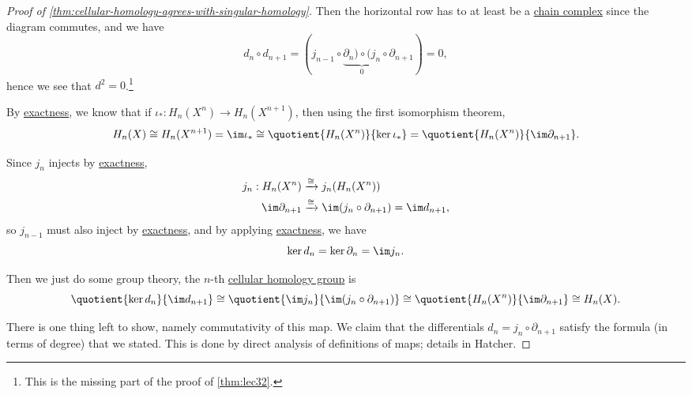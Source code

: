\begin{proof}[Proof of \autoref{thm:cellular-homology-agrees-with-singular-homology}]
	Then the horizontal row has to at least be a \hyperref[def:chain-complex]{chain complex} since the diagram commutes, and we have
	\[
		d_{n} \circ d_{n+1}  = (j_{n - 1} \circ \underbrace{\partial_n) \circ (j_n}_{0} \circ \partial_{n + 1}) = 0,
	\]
	hence we see that \(d^{2} = 0\).\footnote{This is the missing part of the proof of \autoref{thm:lec32}.}

	By \hyperref[def:exact]{exactness}, we know that if \(\iota_\ast \colon H_n(X^n) \to H_n(X^{n + 1})\), then using the first isomorphism theorem,
	\[
		H_n(X) \cong H_n(X^{n + 1}) = \im \iota_\ast \cong  \quotient{H_n(X^n)}{\ker \iota_\ast} = \quotient{H_n(X^n)}{\im \partial_{n + 1}}.
	\]

	Since \(j_n\) injects by \hyperref[def:exact]{exactness},
	\begin{align*}
		j_n : H_n(X^n)       & \xrightarrow{\cong} j_n(H_n(X^n))                                     \\
		\im \partial_{n + 1} & \xrightarrow{\cong} \im (j_n \circ \partial_{n + 1}) = \im d_{n + 1},
	\end{align*}
	so \(j_{n - 1}\) must also inject by \hyperref[def:exact]{exactness}, and by applying \hyperref[def:exact]{exactness}, we have
	\[
		\ker d_n = \ker \partial_n = \im j_n.
	\]

	Then we just do some group theory, the \(n\)-th \hyperref[def:cellular-homology-group]{cellular homology group} is
	\[
		\quotient{\ker d_n}{\im d_{n + 1}} \cong \quotient{\im j_n}{\im (j_n \circ \partial_{n + 1})} \cong \quotient{H_n(X^n)}{\im \partial_{n + 1}} \cong H_n(X).
	\]

	There is one thing left to show, namely commutativity of this map. We claim that the differentials \(d_n = j_n \circ \partial_{n + 1}\)
	satisfy the formula (in terms of degree) that we stated. This is done by direct analysis of definitions of maps; details in Hatcher\cite{hatcher2002algebraic}.
\end{proof}
